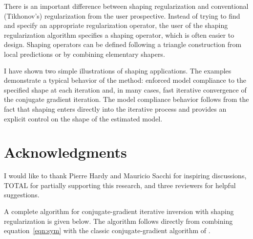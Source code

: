 There is an important difference between shaping regularization and
conventional (Ti\-kho\-nov's) regularization from the user prospective. Instead
of trying to find and specify an appropriate regularization operator, the user
of the shaping regularization algorithm specifies a shaping operator, which is
often easier to design. Shaping operators can be defined following a triangle
construction from local predictions or by combining elementary shapers.

I have shown two simple illustrations of shaping applications. The
examples demonstrate a typical behavior of the method: 
enforced model compliance to the specified shape at each
iteration and, in many cases, fast iterative convergence of the
conjugate gradient iteration. The model compliance
behavior follows from the fact that shaping enters directly into the
iterative process and provides an explicit control on the shape of the
estimated model.



\section{Acknowledgments}
I would like to thank Pierre Hardy and Mauricio Sacchi for inspiring
discussions, TOTAL for partially supporting this research, and three
  reviewers for helpful suggestions.





A complete algorithm for conjugate-gradient iterative inversion with
shaping regularization is given below. The algorithm follows directly
from combining equation~\ref{eqn:sym} with the classic
conjugate-gradient algorithm of \cite{Hestenes.1952}.


